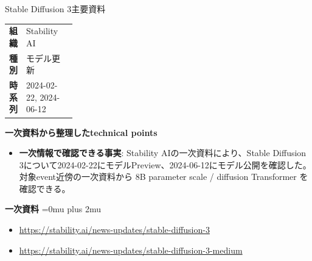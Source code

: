 \Needspace{0.38\textheight}
\begin{technicalnote}{Stable Diffusion 3}{主要資料}
\begingroup
\begin{tabularx}{\linewidth}{@{}>{\bfseries}p{0.22\linewidth}X@{}}
組織 & Stability AI \\
種別 & モデル更新 \\
時系列 & 2024-02-22, 2024-06-12 \\
\end{tabularx}
\smallskip
\begin{minipage}{\linewidth}
{\bfseries 一次資料から整理したtechnical points}
\begin{itemize}[leftmargin=1.5em,itemsep=0.35em]
\item \textbf{一次情報で確認できる事実}: Stability AIの一次資料により、Stable Diffusion 3について2024-02-22にモデルPreview、2024-06-12にモデル公開を確認した。 対象event近傍の一次資料から 8B parameter scale / diffusion Transformer を確認できる。
\end{itemize}
\begin{minipage}{\linewidth}
\begin{samepage}
{\bfseries 一次資料}
\begingroup\sloppy
\Urlmuskip=0mu plus 2mu\relax
\begin{itemize}[leftmargin=1.5em,itemsep=0.25em]
\item {\scriptsize\url{https://stability.ai/news-updates/stable-diffusion-3}}
\item {\scriptsize\url{https://stability.ai/news-updates/stable-diffusion-3-medium}}
\end{itemize}
\endgroup
\end{samepage}
\end{minipage}
\end{minipage}
\endgroup
\end{technicalnote}
\medskip

